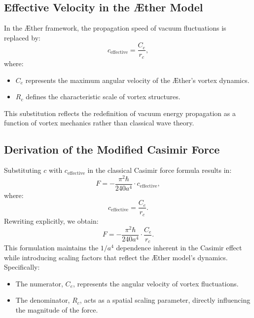 \documentclass[a4paper,10pt]{article}
\begin{document}
    \subsection*{Effective Velocity in the Æther Model}
    In the Æther framework, the propagation speed of vacuum fluctuations is replaced by:
    \begin{equation*}
        c_\text{effective} = \frac{C_e}{r_c},
    \end{equation*}
    where:
    \begin{itemize}
        \item $C_e$ represents the maximum angular velocity of the Æther's vortex dynamics.
        \item $R_c$ defines the characteristic scale of vortex structures.
    \end{itemize}
    This substitution reflects the redefinition of vacuum energy propagation as a function of vortex mechanics rather than classical wave theory.

    \subsection*{Derivation of the Modified Casimir Force}
    Substituting $c$ with $c_\text{effective}$ in the classical Casimir force formula results in:
    \begin{equation*}
        F = -\frac{\pi^2 \hbar}{240 a^4} \cdot c_\text{effective},
    \end{equation*}
    where:
    \begin{equation*}
        c_\text{effective} = \frac{C_e}{r_c}.
    \end{equation*}
    Rewriting explicitly, we obtain:
    \begin{equation*}
        F = -\frac{\pi^2 \hbar}{240 a^4} \cdot \frac{C_e}{r_c}.
    \end{equation*}
    This formulation maintains the $1/a^4$ dependence inherent in the Casimir effect while introducing scaling factors that reflect the Æther model's dynamics. Specifically:
    \begin{itemize}
        \item The numerator, $C_e$, represents the angular velocity of vortex fluctuations.
        \item The denominator, $R_c$, acts as a spatial scaling parameter, directly influencing the magnitude of the force.
    \end{itemize}
\end{document}
